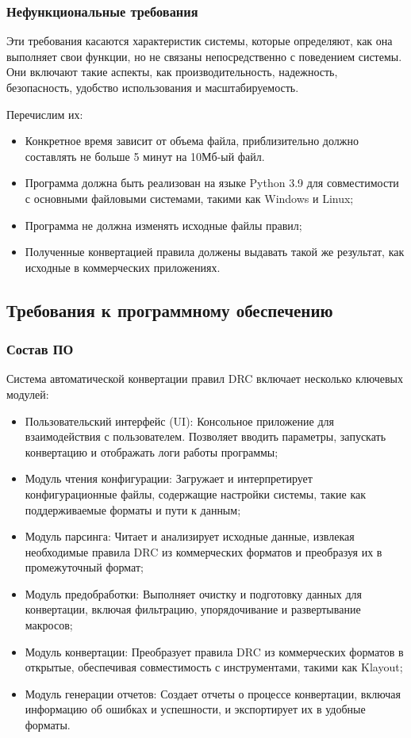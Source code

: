 \subsubsection{Нефункциональные требования}

Эти требования касаются характеристик системы, которые определяют,
как она выполняет свои функции,
но не связаны непосредственно с поведением системы.
Они включают такие аспекты, как производительность, надежность, безопасность,
удобство использования и масштабируемость.

Перечислим их:

\begin{itemize}
	\item Конкретное время зависит от объема файла,
		приблизительно должно составлять не больше 5 минут на 10Мб-ый файл.
    \item Программа должна быть реализован на языке Python 3.9
		для совместимости с основными файловыми системами,
		такими как Windows и Linux;
    \item Программа не должна изменять исходные файлы правил;
    \item Полученные конвертацией правила должены выдавать
		такой же результат, как исходные в коммерческих приложениях.
\end{itemize}

\subsection{Требования к программному обеспечению}

\subsubsection{Состав ПО}

Система автоматической конвертации правил DRC
включает несколько ключевых модулей:

\begin{itemize}
	\item Пользовательский интерфейс (UI):
		Консольное приложение для взаимодействия с пользователем.
		Позволяет вводить параметры, запускать конвертацию
		и отображать логи работы программы;
	\item Модуль чтения конфигурации:
		Загружает и интерпретирует конфигурационные файлы,
		содержащие настройки системы,
		такие как поддерживаемые форматы и пути к данным;
	\item Модуль парсинга:
		Читает и анализирует исходные данные,
		извлекая необходимые правила DRC из коммерческих форматов
		и преобразуя их в промежуточный формат;
	\item Модуль предобработки:
		Выполняет очистку и подготовку данных для конвертации,
		включая фильтрацию, упорядочивание и развертывание макросов;
	\item Модуль конвертации:
		Преобразует правила DRC из коммерческих форматов в открытые,
		обеспечивая совместимость с инструментами, такими как Klayout;
	\item Модуль генерации отчетов:
		Создает отчеты о процессе конвертации,
		включая информацию об ошибках и успешности,
		и экспортирует их в удобные форматы.
\end{itemize}


